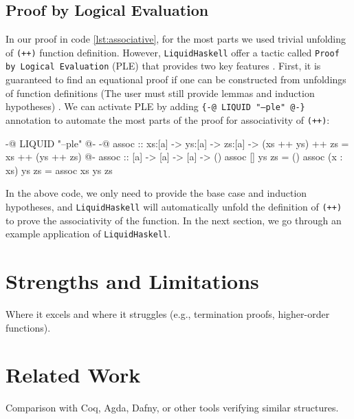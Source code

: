 \subsection{Proof by Logical Evaluation}
In our proof in code \ref{lst:associative}, for the most parts we used trivial unfolding of \texttt{(++)} function definition.
However, \texttt{LiquidHaskell} offer a tactic called \texttt{Proof by Logical Evaluation} (PLE)
that provides two key features \cite{vazou2018}. First, it is guaranteed to find an equational proof if one can be constructed
from unfoldings of function definitions (The user must still provide lemmas and induction hypotheses) \cite{vazou2018}.
We can activate PLE by adding \texttt{\{-@ LIQUID "---ple" @-\}} annotation to automate the most parts of the proof for associativity of \texttt{(++)}:

\begin{code}
	{-@ LIQUID "--ple" @-}
	{-@ assoc :: xs:[a] -> ys:[a] -> zs:[a]
	-> { (xs ++ ys) ++ zs = xs ++ (ys ++ zs) } @-}
	assoc :: [a] -> [a] -> [a] -> ()
	assoc [] ys zs = ()
	assoc (x : xs) ys zs = assoc xs ys zs
\end{code}

In the above code, we only need to provide the base case and induction hypotheses, and
\texttt{LiquidHaskell} will automatically unfold the definition of \texttt{(++)} to prove the associativity of the function.
In the next section, we go through an example application of \texttt{LiquidHaskell}.
\section { Strengths and Limitations }
Where it excels and where it struggles (e.g., termination proofs, higher-order functions).

\section { Related Work }
Comparison with Coq, Agda, Dafny, or other tools verifying similar structures.
